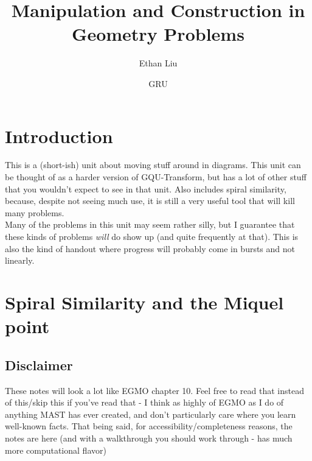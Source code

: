 \documentclass[11pt]{article}
\begin{document}
\title{Manipulation and Construction in Geometry Problems}
\author{Ethan Liu}
\date{GRU}
\maketitle
\section{Introduction}
This is a (short-ish) unit about moving stuff around in diagrams. This unit can be thought of as a harder version of GQU-Transform, but has a lot of other stuff that you wouldn't expect to see in that unit. Also includes spiral similarity, because, despite not seeing much use, it is still a very useful tool that will kill many problems.\\
Many of the problems in this unit may seem rather silly, but I guarantee that these kinds of problems \textit{will} do show up (and quite frequently at that). This is also the kind of handout where progress will probably come in bursts and not linearly.
\section{Spiral Similarity and the Miquel point}
\subsection{Disclaimer}
These notes will look a lot like EGMO chapter 10. Feel free to read that instead of this/skip this if you've read that - I think as highly of EGMO as I do of anything MAST has ever created, and don't particularly care where you learn well-known facts. That being said, for accessibility/completeness reasons, the notes are here (and with a walkthrough you should work through - has much more computational flavor) 
\end{document}

